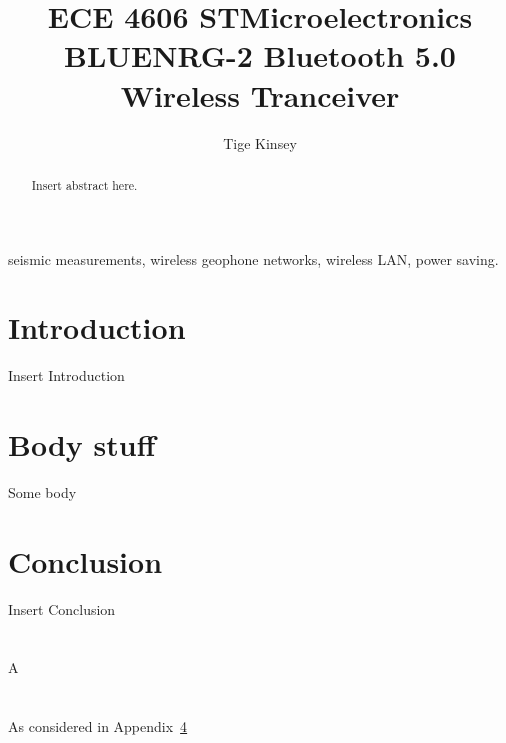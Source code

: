 \documentclass[12pt,journal,onecolumn,draftclsnofoot]{IEEEtran}
\begin{document}
\title{ECE 4606 STMicroelectronics BLUENRG-2 Bluetooth 5.0 Wireless Tranceiver }

\author{Tige Kinsey
}


\maketitle
\vspace{-18mm}

\begin{abstract}
Insert abstract here.
\end{abstract}

\begin{IEEEkeywords}
seismic measurements, wireless geophone networks, wireless LAN, power saving.
\end{IEEEkeywords}

\IEEEpeerreviewmaketitle
\newpage
\section{Introduction}
Insert Introduction
\section{Body stuff}
Some body
\section{Conclusion}
Insert Conclusion
\appendices
\section{}
\label{appendix:hessian}
A
\section{}
\label{appendix:mon-dec}
As considered in Appendix~\ref{appendix:hessian}
\end{document}
